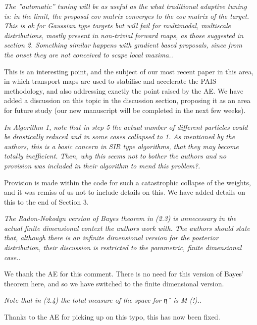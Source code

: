 \documentclass{article}
\newcommand{\comment}[2]{\vspace{0.6cm}{\bf Comment:} {\it #1.}

\vspace{0.3cm}{\bf Answer:} #2}
\begin{document}
\comment{The ”automatic” tuning will be as useful as the what traditional adaptive tuning is: in the limit, the proposal cov matrix converges to the cov matrix of the target. This is ok for Gaussian type targets but will fail for multimodal, multiscale distributions, mostly present in non-trivial forward maps, as those suggested in section 2. Something similar happens with gradient based proposals, since from the onset they are not conceived to scape local maxima.}{This is an interesting point, and the subject of our most recent paper in this area, in which transport maps are used to stabilise and accelerate the PAIS methodology, and also addressing exactly the point raised by the AE. We have added a discussion on this topic in the discussion section, proposing it as an area for future study (our new manuscript will be completed in the next few weeks).}%

\comment{In Algorithm 1, note that in step 5 the actual number of different particles could be drastically reduced and in some cases collapsed to 1. As mentioned by the authors, this is a basic concern in SIR type algorithms, that they may become totally inefficient. Then, why this seems not to bother the authors and no provision was included in their algorithm to mend this problem?}{Provision is made within the code for such a catastrophic collapse of the weights, and it was remiss of us not to include details on this. We have added details on this to the end of Section 3.}%

\comment{The Radon-Nokodyn version of Bayes theorem in (2.3) is unnecessary in the actual finite dimensional context the authors work with. The authors should state that, although there is an infinite dimensional version for the posterior distribution, their discussion is restricted to the parametric, finite dimensional case.}{We thank the AE for this comment. There is no need for this version of Bayes' theorem here, and so we have switched to the finite dimensional version.}%

\comment{Note that in (2.4) the total measure of the space for ηˆ is M (!).}{Thanks to the AE for picking up on this typo, this has now been fixed.}%
\end{document}
